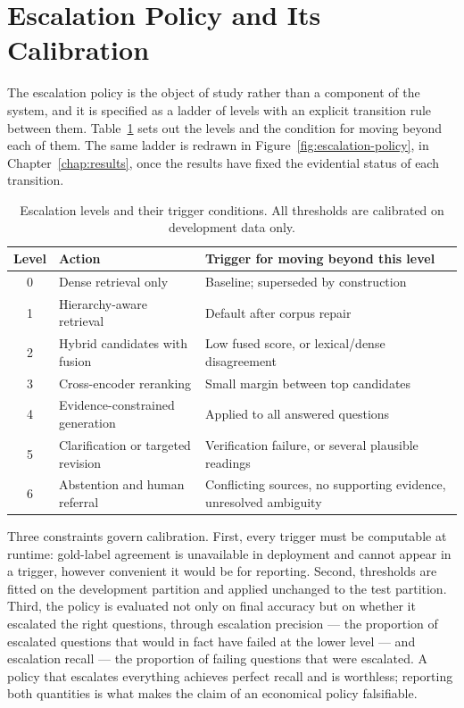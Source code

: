 \section{Escalation Policy and Its Calibration}
\label{sec:method-escalation}

The escalation policy is the object of study rather than a component of the system, and it is specified as a ladder of levels with an explicit transition rule between them. Table~\ref{tab:escalation-method} sets out the levels and the condition for moving beyond each of them. The same ladder is redrawn in Figure~\ref{fig:escalation-policy}, in Chapter~\ref{chap:results}, once the results have fixed the evidential status of each transition.

\begin{table}[htbp]
  \centering
  \caption{Escalation levels and their trigger conditions. All thresholds are calibrated on development data only.}
  \label{tab:escalation-method}
  \small
  \begin{tabularx}{\textwidth}{@{}c l X@{}}
    \toprule
    \textbf{Level} & \textbf{Action} & \textbf{Trigger for moving beyond this level} \\
    \midrule
    0 & Dense retrieval only & Baseline; superseded by construction \\
    1 & Hierarchy-aware retrieval & Default after corpus repair \\
    2 & Hybrid candidates with fusion & Low fused score, or lexical/dense disagreement \\
    3 & Cross-encoder reranking & Small margin between top candidates \\
    4 & Evidence-constrained generation & Applied to all answered questions \\
    5 & Clarification or targeted revision & Verification failure, or several plausible readings \\
    6 & Abstention and human referral & Conflicting sources, no supporting evidence, unresolved ambiguity \\
    \bottomrule
  \end{tabularx}
\end{table}

Three constraints govern calibration. First, every trigger must be computable at runtime: gold-label agreement is unavailable in deployment and cannot appear in a trigger, however convenient it would be for reporting. Second, thresholds are fitted on the development partition and applied unchanged to the test partition. Third, the policy is evaluated not only on final accuracy but on whether it escalated the right questions, through escalation precision --- the proportion of escalated questions that would in fact have failed at the lower level --- and escalation recall --- the proportion of failing questions that were escalated. A policy that escalates everything achieves perfect recall and is worthless; reporting both quantities is what makes the claim of an economical policy falsifiable.

